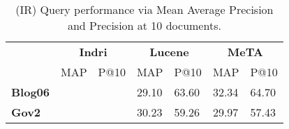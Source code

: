 \begin{table}[t]
\centering
{\small
    \begin{tabular}{|l|p{.65cm}p{.65cm}|p{.65cm}p{.65cm}|p{.65cm}p{.65cm}|}
    \hline &
    \multicolumn{2}{c|}{\textbf{Indri}} &
    \multicolumn{2}{c|}{\textbf{Lucene}} &
    \multicolumn{2}{c|}{\textbf{MeTA}} \\
    & MAP & P@10 & MAP & P@10 & MAP & P@10\\
    \hline
    \textbf{Blog06} & & & 29.10 & 63.60 & 32.34 & 64.70 \\
    \textbf{Gov2} & & & 30.23 & 59.26 & 29.97 & 57.43 \\
    \hline
\end{tabular}
\caption{(IR) Query performance via Mean Average Precision and Precision at 10
    documents.}
\label{table:ir-map}
}
\end{table}
